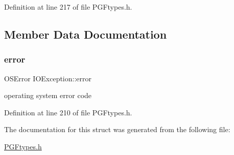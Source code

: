 Definition at line 217 of file P\+G\+Ftypes.\+h.


\begin{DoxyCode}{0}

\end{DoxyCode}


\subsection{Member Data Documentation}
\mbox{\label{structIOException_a0bb5b188546419d80622e4e5ef951ec7}} 
\subsubsection{\texorpdfstring{error}{error}}
{\footnotesize\ttfamily O\+S\+Error I\+O\+Exception\+::error}



operating system error code 



Definition at line 210 of file P\+G\+Ftypes.\+h.



The documentation for this struct was generated from the following file\+:\begin{DoxyCompactItemize}
\item 
\mbox{\hyperlink{PGFtypes_8h}{P\+G\+Ftypes.\+h}}\end{DoxyCompactItemize}
